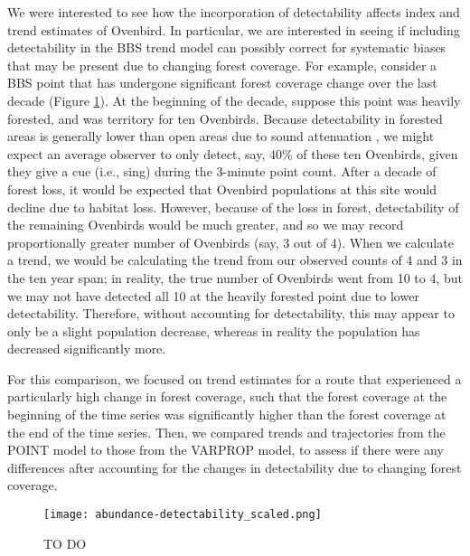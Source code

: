 \documentclass[12pt]{article}
\begin{document}
\par We were interested to see how the incorporation of detectability affects index and trend estimates of Ovenbird.
In particular, we are interested in seeing if including detectability in the BBS trend model can possibly correct for systematic biases that may be present due to changing forest coverage.
For example, consider a BBS point that has undergone significant forest coverage change over the last decade (Figure \ref{fig:example}).
At the beginning of the decade, suppose this point was heavily forested, and was territory for ten Ovenbirds. 
Because detectability in forested areas is generally lower than open areas due to sound attenuation \citep{yip_sound_2017}, we might expect an average observer to only detect, say, 40\% of these ten Ovenbirds, given they give a cue (i.e., sing) during the 3-minute point count.
After a decade of forest loss, it would be expected that Ovenbird populations at this site would decline due to habitat loss.
However, because of the loss in forest, detectability of the remaining Ovenbirds would be much greater, and so we may record proportionally greater number of Ovenbirds (say, 3 out of 4).
When we calculate a trend, we would be calculating the trend from our observed counts of 4 and 3 in the ten year span; in reality, the true number of Ovenbirds went from 10 to 4, but we may not have detected all 10 at the heavily forested point due to lower detectability.
Therefore, without accounting for detectability, this may appear to only be a slight population decrease, whereas in reality the population has decreased significantly more.

\par For this comparison, we focused on trend estimates for a route that experienced a particularly high change in forest coverage, such that the forest coverage at the beginning of the time series was significantly higher than the forest coverage at the end of the time series.
Then, we compared trends and trajectories from the POINT model to those from the VARPROP model, to assess if there were any differences after accounting for the changes in detectability due to changing forest coverage.

\begin{figure}[h]
	\texttt{[image: abundance-detectability\_scaled.png]}
	\caption{TO DO}
	\label{fig:example}
\end{figure}
\end{document}
